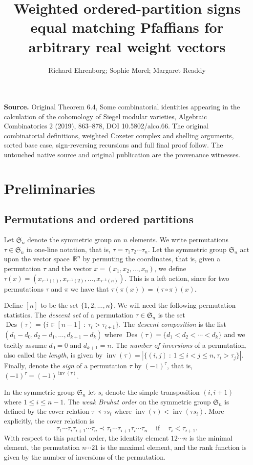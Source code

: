 \documentclass[10pt]{amsart}
\title[Weighted partitions and matching sums]{Weighted ordered-partition signs equal matching Pfaffians for arbitrary real weight vectors}
\author{Richard Ehrenborg; Sophie Morel; Margaret Readdy}
\date{}
\theoremstyle{definition}
\newcommand{\Rrr}{\mathbb{R}}
\newcommand{\Sym}{\mathfrak{S}}
\DeclareMathOperator{\Des}{Des}
\DeclareMathOperator{\inv}{inv}
\newcommand{\coveredby}{\prec}
\begin{document}
\maketitle
\noindent\textbf{Source.} Original Theorem 6.4, Some combinatorial identities appearing in the calculation of the cohomology of Siegel modular varieties, Algebraic Combinatorics 2 (2019), 863--878, DOI 10.5802/alco.66. The original combinatorial definitions, weighted Coxeter complex and shelling arguments, sorted base case, sign-reversing recursions and full final proof follow. The untouched native source and original publication are the provenance witnesses.
\setcounter{section}{1}
\section{Preliminaries}
\label{section_preliminaries}

\subsection{Permutations and ordered partitions}

Let $\Sym_{n}$ denote the symmetric group on $n$ elements.
We write permutations $\tau \in \Sym_{n}$ in one-line notation, that is,
$\tau = \tau_{1} \tau_{2} \cdots \tau_{n}$.
Let the symmetric group $\Sym_{n}$ act upon the
vector space~$\Rrr^{n}$ by permuting the coordinates,
that is,
given a permutation $\tau$
and the vector $x = (x_{1}, x_{2}, \ldots, x_{n})$,
we define
$\tau(x) = (x_{\tau^{-1}(1)}, x_{\tau^{-1}(2)}, \ldots, x_{\tau^{-1}(n)})$.
This is a left action, since
for two permutations $\tau$ and $\pi$ we have that
$\tau(\pi(x)) = (\tau \circ \pi)(x)$.

Define $[n]$ to be the set $\{1,2, \ldots, n\}$.
We will need the following permutation statistics.
The \emph{descent set} of a permutation $\tau \in \Sym_{n}$
is the set
$\Des(\tau) = \{i \in [n-1] \: : \: \tau_{i} > \tau_{i+1}\}$.
The \emph{descent composition} is the list
$(d_{1}-d_{0}, d_{2}-d_{1}, \ldots, d_{k+1}-d_{k})$
where $\Des(\tau) = \{d_{1} < d_{2} < \cdots < d_{k}\}$
and we tacitly assume $d_{0} = 0$ and $d_{k+1} = n$.
The \emph{number of inversions} of a permutation, also called the
\emph{length},
is given by
$\inv(\tau) = |\{(i,j) \: : \: 1 \leq i < j \leq n, \tau_{i} > \tau_{j}\}|$.
Finally, denote the \emph{sign} of a permutation $\tau$ by
$(-1)^{\tau}$, that is,
$(-1)^{\tau} = (-1)^{\inv(\tau)}$.

In the symmetric group $\Sym_{n}$
let $s_{i}$ denote the simple transposition $(i,i+1)$
where $1 \leq i \leq n-1$.
The \emph{weak Bruhat order} on the symmetric group $\Sym_{n}$
is defined by the cover relation
$\tau \coveredby \tau s_{i}$ where
$\inv(\tau) < \inv(\tau s_{i})$.
More explicitly, the cover relation is
$$
\tau_{1} \cdots \tau_{i} \tau_{i+1} \cdots \tau_{n}
\coveredby
\tau_{1} \cdots \tau_{i+1} \tau_{i} \cdots \tau_{n}
\:\:\:\:
\text{ if }
\:\:\:\:
\tau_{i} < \tau_{i+1} .
$$
With respect to this partial order,
the identity element $12 \cdots n$ is the minimal element,
the permutation $n \cdots 21$ is the maximal element,
and the rank function is given by the number of inversions
of the permutation.
\end{document}
